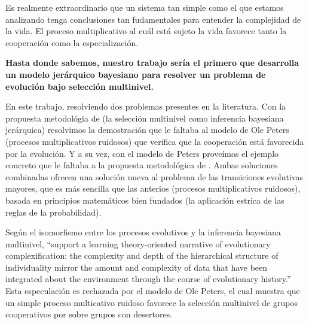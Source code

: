 \documentclass[a4paper,10pt]{article}
\begin{document}
Es realmente extraordinario que un sistema tan simple como el que estamos analizando tenga conclusiones tan fudamentales para entender la complejidad de la vida.
El proceso multiplicativo al cuál está sujeto la vida favorece tanto la cooperación como la especialización.


\textbf{Hasta donde sabemos, nuestro trabajo sería el primero que desarrolla un modelo jerárquico bayesiano para resolver un problema de evolución bajo selección multinivel.}



En este trabajo, resolviendo dos problemas presentes en la literatura.
Con la propuesta metodológia de \cite{czegel2019-bayesianEvolution} (la selección multinivel como inferencia bayesiana jerárquica) resolvimos la demostración que le faltaba al modelo de Ole Peters (procesos multiplicativos ruidosos) que verifica que la cooperación está favorecida por la evolución.
Y a su vez, con el modelo de Peters proveímos el ejemplo concreto que le faltaba a la propuesta metodológica de \cite{czegel2019-bayesianEvolution}.
Ambas soluciones combinadas ofrecen una solución nueva al problema de las transiciones evolutivas mayores, que es más sencilla que las anterios (procesos multiplicativos ruidosos), basada en principios matemáticos bien fundados (la aplicación estrica de las reglas de la probabilidad).

Según \cite{czegel2019-bayesianEvolution} el isomorfismo entre los procesos evolutivos y la inferencia bayesiana multinivel,  ``support a learning theory-oriented narrative of evolutionary complexification: the complexity and depth of the hierarchical structure of individuality mirror the amount and complexity of data that have been integrated about the environment through the course of evolutionary history.''
Esta especulación es rechazada por el modelo de Ole Peters, el cual muestra que un simple proceso multicativo ruidoso favorece la selección multinivel de grupos cooperativos por sobre grupos con desertores.
\end{document}
